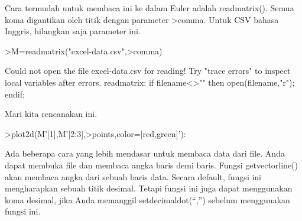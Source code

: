 \documentclass[a4paper,10pt]{article}
\begin{document}
\begin{eulernotebook}
\begin{eulercomment}
\begin{eulercomment}
\begin{eulercomment}
\begin{eulercomment}
\begin{eulercomment}
\begin{eulercomment}
\begin{eulercomment}
\begin{eulercomment}
\begin{eulercomment}
\begin{eulercomment}
\begin{eulercomment}
\begin{eulercomment}
\begin{eulercomment}
\begin{eulercomment}
\begin{eulercomment}
\begin{eulercomment}
\begin{eulercomment}
\begin{eulercomment}
\begin{eulercomment}
\begin{eulercomment}
\begin{eulercomment}
\begin{eulercomment}
\begin{eulercomment}
\begin{eulercomment}
\begin{eulercomment}
Cara termudah untuk membaca ini ke dalam Euler adalah readmatrix().
Semua koma digantikan oleh titik dengan parameter \textgreater{}comma. Untuk CSV
bahasa Inggris, hilangkan saja parameter ini.
\end{eulercomment}
\begin{eulerprompt}
>M=readmatrix("excel-data.csv",>comma)
\end{eulerprompt}
\begin{euleroutput}
  Could not open the file
  excel-data.csv
  for reading!
  Try "trace errors" to inspect local variables after errors.
  readmatrix:
      if filename<>"" then open(filename,"r"); endif;
\end{euleroutput}
\begin{eulercomment}
Mari kita rencanakan ini.
\end{eulercomment}
\begin{eulerprompt}
>plot2d(M'[1],M'[2:3],>points,color=[red,green]'):
\end{eulerprompt}
\begin{eulercomment}
Ada beberapa cara yang lebih mendasar untuk membaca data dari file.
Anda dapat membuka file dan membaca angka baris demi baris. Fungsi
getvectorline() akan membaca angka dari sebuah baris data. Secara
default, fungsi ini mengharapkan sebuah titik desimal. Tetapi fungsi
ini juga dapat menggunakan koma desimal, jika Anda memanggil
setdecimaldot(“,”) sebelum menggunakan fungsi ini.


\end{eulercomment}
\end{eulercomment}
\end{eulercomment}
\end{eulercomment}
\end{eulercomment}
\end{eulercomment}
\end{eulercomment}
\end{eulercomment}
\end{eulercomment}
\end{eulercomment}
\end{eulercomment}
\end{eulercomment}
\end{eulercomment}
\end{eulercomment}
\end{eulercomment}
\end{eulercomment}
\end{eulercomment}
\end{eulercomment}
\end{eulercomment}
\end{eulercomment}
\end{eulercomment}
\end{eulercomment}
\end{eulercomment}
\end{eulercomment}
\end{eulercomment}
\end{eulernotebook}
\end{document}
